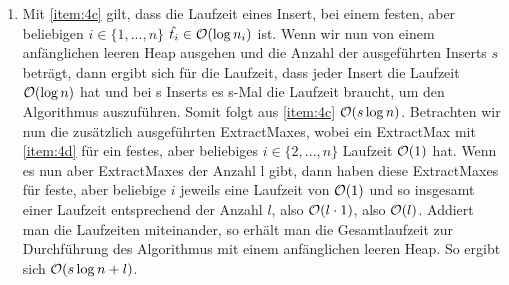 \documentclass{scrartcl} %
\begin{document}
\begin{aufgabe}
\begin{enumerate}[label=(\alph*)]
            \begin{align*}
                &\hat{t_i}=kn_i \cdot \ln\Big(\frac{n_i}{n_{i}+1}\Big) \leq kn_i\frac{2}{n_i} = 2k
            \end{align*}
            Da $2k$ für ein geeignetes $k$ in $\BigO(1)$ ist, gilt $\hat{t_i} \in \BigO(1)$.
            Für $n_{i-1}=1$ ist der Fall trivialer und es gilt $\hat{t_i}=k \cdot \ln \max\{n_{i-1},1\} + kn_i\ln(n_i)-kn_{i-1}\ln(n_{i-1})$. Dann ergibt sich, da $n_i=0$, sofort $$\hat{t_i}=k ln (1) -k\ln(1)= 0.$$ Daher gilt für $\hat{t_i} \in \BigO(1)$, da null in $\BigO(1)$ ist.
            \item \label{item:4e}Mit \ref{item:4c} gilt, dass die Laufzeit eines {\ttfamily Insert}, bei einem festen, aber beliebigen $i \in \{1, ..., n\}$ $\hat{t_i} \in \operatorname{\mathcal{O}}(\log n_i)$ ist. Wenn wir nun von einem anfänglichen leeren Heap ausgehen und die Anzahl der ausgeführten {\ttfamily Insert}s $s$ beträgt, dann ergibt sich für die Laufzeit, dass jeder {\ttfamily Insert} die Laufzeit $\operatorname{\mathcal{O}}(\log n)$ hat und bei s {\ttfamily Insert}s es s-Mal die Laufzeit braucht, um den Algorithmus auszuführen. Somit folgt aus \ref{item:4c} $\operatorname{\mathcal{O}}(s \log n)$. Betrachten wir nun die zusätzlich ausgeführten {\ttfamily ExtractMax}es, wobei ein {\ttfamily ExtractMax} mit \ref{item:4d} für ein festes, aber beliebiges $i \in \{2, ..., n\}$ Laufzeit $\BigO(1)$ hat. Wenn es nun aber {\ttfamily ExtractMax}es der Anzahl l gibt, dann haben diese {\ttfamily ExtractMax}es für feste, aber beliebige $i$ jeweils eine Laufzeit von $\BigO(1)$ und so insgesamt einer Laufzeit entsprechend der Anzahl $l$, also $\operatorname{\mathcal{O}}(l \cdot 1)$, also $\operatorname{\mathcal{O}}(l)$. Addiert man die Laufzeiten miteinander, so erhält man die Gesamtlaufzeit zur Durchführung des Algorithmus mit einem anfänglichen leeren Heap. So ergibt sich $\operatorname{\mathcal{O}}(s \log n + l)$.
        \end{enumerate}
    \end{aufgabe}
\end{document}
